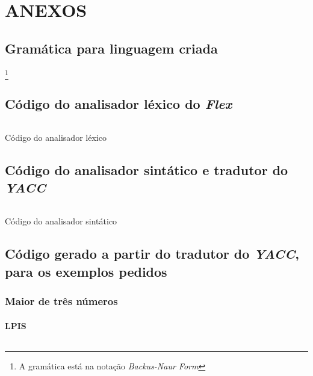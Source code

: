 \appendix

\part*{ANEXOS}

\chapter{Gramática para linguagem criada}\footnote{A gramática está na notação
	\emph{Backus-Naur Form}}
\label{appendix:a}

\chapter{Código do analisador léxico do \emph{Flex}}
\label{appendix:b}
\begin{longlisting}
	\inputminted{c}{src/gerador.l}
	\caption{Código do analisador léxico}
\label{listing:b}
\end{longlisting}

\chapter{Código do analisador sintático e tradutor do \emph{YACC}}
\label{appendix:c}
\begin{longlisting}
	\inputminted{c}{src/gerador.y}
	\caption{Código do analisador sintático}
\label{listing:c}
\end{longlisting}

\chapter{Código gerado a partir do tradutor do \emph{YACC}, para os exemplos
pedidos}
\label{appendix:d}
\section{Maior de três números}
\label{appendix:d:sec:d1}

\subsection{LPIS}
\begin{longlisting}
	\inputminted{text}{testes/testesPedidos/01codLpis.txt}
	
\end{longlisting}


